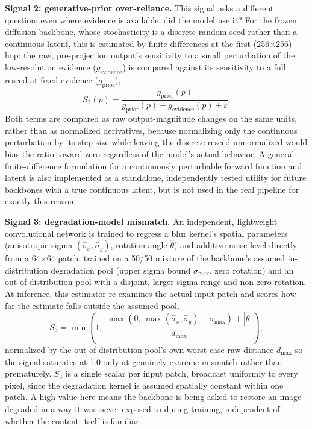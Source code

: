 \documentclass[review]{elsarticle}
\begin{document}
\textbf{Signal 2: generative-prior over-reliance.} This signal asks a different question: even where evidence is available, did the model use it? For the frozen diffusion backbone, whose stochasticity is a discrete random seed rather than a continuous latent, this is estimated by finite differences at the first (256$\times$256) hop: the raw, pre-projection output's sensitivity to a small perturbation of the low-resolution evidence ($g_{\text{evidence}}$) is compared against its sensitivity to a full reseed at fixed evidence ($g_{\text{prior}}$),
\begin{equation}
S_2(p) = \frac{g_{\text{prior}}(p)}{g_{\text{prior}}(p) + g_{\text{evidence}}(p) + \varepsilon}.
\label{eq:s2}
\end{equation}
Both terms are compared as raw output-magnitude changes on the same units, rather than as normalized derivatives, because normalizing only the continuous perturbation by its step size while leaving the discrete reseed unnormalized would bias the ratio toward zero regardless of the model's actual behavior. A general finite-difference formulation for a continuously perturbable forward function and latent is also implemented as a standalone, independently tested utility for future backbones with a true continuous latent, but is not used in the real pipeline for exactly this reason.

\textbf{Signal 3: degradation-model mismatch.} An independent, lightweight convolutional network is trained to regress a blur kernel's spatial parameters (anisotropic sigma $(\hat\sigma_x, \hat\sigma_y)$, rotation angle $\hat\theta$) and additive noise level directly from a 64$\times$64 patch, trained on a 50/50 mixture of the backbone's assumed in-distribution degradation pool (upper sigma bound $\sigma_{\max}$, zero rotation) and an out-of-distribution pool with a disjoint, larger sigma range and non-zero rotation. At inference, this estimator re-examines the actual input patch and scores how far the estimate falls outside the assumed pool,
\begin{equation}
S_3 = \min\!\left(1,\; \frac{\max(0,\, \max(\hat\sigma_x, \hat\sigma_y) - \sigma_{\max}) + |\hat\theta|}{d_{\max}}\right),
\label{eq:s3}
\end{equation}
normalized by the out-of-distribution pool's own worst-case raw distance $d_{\max}$ so the signal saturates at 1.0 only at genuinely extreme mismatch rather than prematurely. $S_3$ is a single scalar per input patch, broadcast uniformly to every pixel, since the degradation kernel is assumed spatially constant within one patch. A high value here means the backbone is being asked to restore an image degraded in a way it was never exposed to during training, independent of whether the content itself is familiar.
\end{document}
